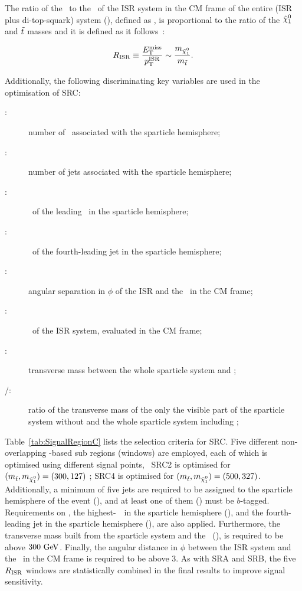 				The ratio of the \met\ to the \pt\ of the \ac{ISR} system in the \ac{CM} frame of the entire (\ac{ISR} plus di-top-squark) system (\pTISR), defined as \rISR, is proportional to the ratio of the $\ninoone$ and $\tilde{t}$ masses and it is defined as it follows~\cite{An,Macaluso}:
				
				\begin{equation*}
					\rISR \equiv \frac{\met}{\pTISR} \sim \frac{m_{\ninoone}}{m_{\stop}}. 
				\end{equation*}

				\noindent Additionally, the following discriminating key variables are used in the optimisation of SRC: 

				\begin{description}
					\item[\boldmath \nBJetS:] number of \bjs\ associated with the sparticle hemisphere;
					\item[\boldmath \nJetS:] number of jets associated with the sparticle hemisphere;
					\item[\boldmath \pTSBZero:] \pt\ of the leading \bj\ in the sparticle hemisphere;
					\item[\boldmath \pTSFour:] \pt\ of the fourth-leading jet in the sparticle hemisphere;
					\item[\boldmath \dPhiISRMET:] angular separation in $\phi$ of the \ac{ISR} and the \met\ in the \ac{CM} frame;
					\item[\boldmath \pTISR:] \pt\ of the \ac{ISR} system, evaluated in the \ac{CM} frame;
					\item[\boldmath \mS:] transverse mass between the whole sparticle system and \met;
					\item[\boldmath \mV/\mS:] ratio of the transverse mass of the only the visible part of the sparticle system without \met and the whole sparticle system including \met;
				\end{description}				

				Table~\ref{tab:SignalRegionC} lists the selection criteria for SRC. Five different non-overlapping \RISR-based sub regions (windows) are employed, each of which is optimised using different signal points, \eg\ SRC2 is optimised for $(\mstop, \mninoone) = (300,127) $ \GeV; SRC4 is optimised for $(\mstop, \mninoone) = (500,327)$. Additionally, a minimum of five jets are required to be assigned to the sparticle hemisphere of the event (\nJetS), and at least one of them (\nBJetS) must be $b$-tagged. Requirements on \pTISR, the highest-\pt\ \bj\ in the sparticle hemisphere (\pTSBZero), and the fourth-leading jet in the sparticle hemisphere (\pTSFour), are also applied. Furthermore, the transverse mass built from the sparticle system and the \met\ (\mS), is required to be above $300\GeV$. Finally, the angular distance in $\phi$ between the \ac{ISR} system and the \ptmiss\ in the \ac{CM} frame is required to be above $3$. As with SRA and SRB, the five $R_{\mathrm{ISR}}$ windows are statistically combined in the final results to improve signal sensitivity.





